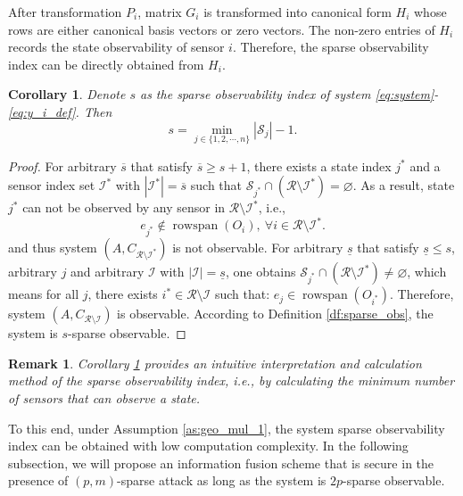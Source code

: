 \documentclass{ieeetrans}   %
\newcommand{\Ic}{{\mathcal{I}}}
\newcommand{\Rc}{{\mathcal{R}}}
\newcommand{\Sc}{{\mathcal{S}}}
\DeclareMathOperator{\rs}{{rowspan}}
\newtheorem{remark}{\textbf{Remark}}
\newtheorem{corollary}{\textbf{Corollary}}
\newtheorem*{proof}{\textbf{Proof}}
\begin{document}
After transformation $P_i$, matrix $G_i$ is transformed into canonical form $H_{i}$ whose rows are either canonical basis vectors or zero vectors. 
The non-zero entries of $H_i$ records the state observability of sensor $i$. Therefore, the sparse observability index can be directly obtained from $H_i$.
\begin{corollary}\label{co:sparse_obs}
	Denote $s$ as the sparse observability index of system \eqref{eq:system}-\eqref{eq:y_i_def}. Then 
	\begin{equation*}
		s=\min_{j\in\{1,2,\cdots,n\}} |\Sc_{j}| - 1 .
	\end{equation*}
\end{corollary} 
\begin{proof}
	For arbitrary $\overline{s}$ that satisfy $\overline{s}\geq s+1$, there exists a state index $j^*$ and a sensor index set $\Ic^*$ with $|\Ic^*|=\overline{s}$ such that $\Sc_{j^*} \cap \left(\Rc\setminus\Ic^*\right)=\varnothing$.
	As a result, state $j^*$ can not be observed by any sensor in $\Rc\setminus \Ic^*$, i.e.,
	\begin{equation*}
		e_{j^*}\notin \rs(O_i),\ \forall i\in\Rc\setminus \Ic^*.
	\end{equation*}
	and thus system $(A,C_{\Rc\setminus\Ic^*})$ is not observable.
	For arbitrary $\underline{s}$ that satisfy $\underline{s}\leq s$, arbitrary $j$ and arbitrary $\Ic$ with $|\Ic|=\underline{s}$, one obtains $\Sc_{j^*} \cap \left(\Rc\setminus\Ic^*\right)\neq\varnothing$, which means for all $j$, there exists $i^*\in\Rc\setminus \Ic$ such that: $e_{j}\in \rs(O_{i^*})$. Therefore, system $(A,C_{\Rc\setminus\Ic})$ is observable. According to Definition \ref{df:sparse_obs}, the system is $s$-sparse observable.
\end{proof}
\begin{remark}
	Corollary \ref{co:sparse_obs} provides an intuitive interpretation and calculation method of the sparse observability index, i.e., by calculating the minimum number of sensors that can observe a state.
\end{remark}
To this end, under Assumption \ref{as:geo_mul_1}, the system sparse observability index can be obtained with low computation complexity. In the following subsection, we will propose an information fusion scheme that is secure in the presence of $(p,m)$-sparse attack as long as the system is $2p$-sparse observable.
\end{document}
